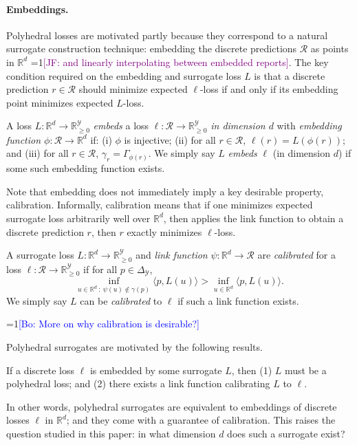 \documentclass[anon]{colt2020} %
\newcommand{\Comments}{1}
\newcommand{\mynote}[2]{\ifnum\Comments=1\textcolor{#1}{#2}\fi}
\newcommand{\jessie}[1]{\mynote{purple}{[JF: #1]}}
\newcommand{\bo}[1]{\mynote{blue}{[Bo: #1]}}
\newcommand{\reals}{\mathbb{R}}
\newcommand{\nonnegreals}{\reals_{\geq 0}}%
\newcommand{\simplex}{\Delta_\Y}
\newcommand{\R}{\mathcal{R}}
\newcommand{\Y}{\mathcal{Y}}
\newcommand{\inprod}[2]{\langle #1, #2 \rangle}%
\begin{document}
\paragraph{Embeddings.}
Polyhedral losses are motivated partly because they correspond to a natural surrogate construction technique: embedding the discrete predictions $\R$ as points in $\reals^d$ \jessie{and linearly interpolating between embedded reports}.
The key condition required on the embedding and surrogate loss $L$ is that a discrete prediction $r \in \R$ should minimize expected $\ell$-loss if and only if its embedding point minimizes expected $L$-loss.
%
\begin{definition}
  A loss $L: \reals^d \to \nonnegreals^{\Y}$ \emph{embeds} a loss $\ell: \R \to \nonnegreals^{\Y}$ \emph{in dimension $d$} with \emph{embedding function $\phi: \R \to \reals^d$} if: (i) $\phi$ is injective; (ii) for all $r \in \R$, $\ell(r) = L(\phi(r))$; and (iii) for all $r \in \R$, $\gamma_r = \Gamma_{\phi(r)}$.
  We simply say $L$ \emph{embeds} $\ell$ (in dimension $d$) if some such embedding function exists.
\end{definition}
%
Note that embedding does not immediately imply a key desirable property, calibration.
Informally, calibration means that if one minimizes expected surrogate loss arbitrarily well over $\reals^d$, then applies the link function to obtain a discrete prediction $r$, then $r$ exactly minimizes $\ell$-loss.
\begin{definition}\label{def:calibration}
  A surrogate loss $L: \reals^d \to \nonnegreals^{\Y}$ and \emph{link function} $\psi: \reals^d \to \R$ are \emph{calibrated} for a loss $\ell: \R \to \nonnegreals^{\Y}$ if for all $p \in \simplex$,
    \[ \inf_{u \in \reals^d ~:~ \psi(u) \not\in \gamma(p)} \inprod{p}{L(u)}  > \inf_{u \in \reals^d} \inprod{p}{L(u)}  .\]
  We simply say $L$ can be \emph{calibrated} to $\ell$ if such a link function exists.
\end{definition}
\bo{More on why calibration is desirable?}

Polyhedral surrogates are motivated by the following results.
\begin{theorem} \label{thm:embed-iff-poly}
  If a discrete loss $\ell$ is embedded by some surrogate $L$, then (1) $L$ must be a polyhedral loss; and (2) there exists a link function calibrating $L$ to $\ell$.
\end{theorem}
In other words, polyhedral surrogates are equivalent to embeddings of discrete losses $\ell$ in $\reals^d$; and they come with a guarantee of calibration.
This raises the question studied in this paper: in what dimension $d$ does such a surrogate exist?
\end{document}
